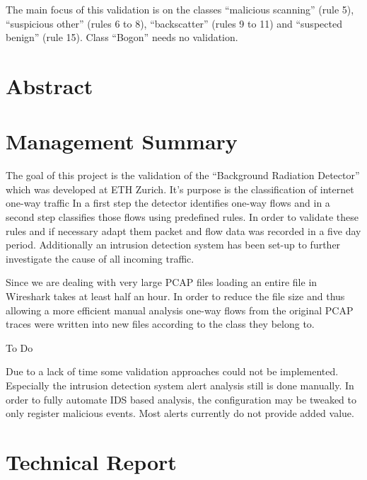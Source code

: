 \documentclass[a4paper]{scrartcl}
\begin{document}
The main focus of this validation is on the classes ``malicious scanning'' (rule 5), ``suspicious other'' (rules 6 to 8), ``backscatter'' (rules 9 to 11) and ``suspected benign'' (rule 15). Class ``Bogon'' needs no validation.
\newpage

\section{Abstract}

\section{Management Summary}
The goal of this project is the validation of the ``Background Radiation Detector'' which was developed at ETH Zurich. It's purpose is the classification of internet one-way traffic In a first step the detector identifies one-way flows and in a second step classifies those flows using predefined rules. In order to validate these rules and if necessary adapt them packet and flow data was recorded in a five day period. Additionally an intrusion detection system has been set-up to further investigate the cause of all incoming traffic.

Since we are dealing with very large PCAP files loading an entire file in Wireshark takes at least half an hour. In order to reduce the file size and thus allowing a more efficient manual analysis one-way flows from the original PCAP traces were written into new files according to the class they belong to.



To  Do

Due to a lack of time some validation approaches could not be implemented. Especially the intrusion detection system alert analysis still is done manually. In order to fully automate IDS based analysis, the configuration may be tweaked to only register malicious events. Most alerts currently do not provide added value.


\section{Technical Report}
\end{document}
